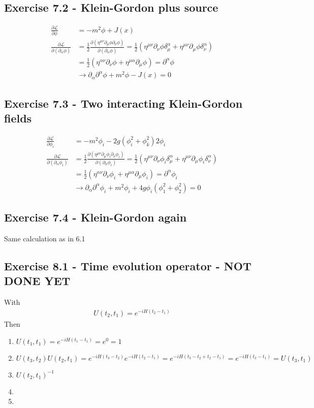 \documentclass[../main.tex]{subfiles}
\begin{document}
\subsection*{Exercise 7.2 - Klein-Gordon plus source}
\begin{align}
\frac{\partial\mathcal{L}}{\partial\phi}
&=-m^2\phi+J(x)\\
\frac{\partial\mathcal{L}}{\partial(\partial_\alpha\phi)}
&=\frac{1}{2}\frac{\partial(\eta^{\mu\nu}\partial_\mu\phi\partial_\nu\phi)}{\partial(\partial_\alpha\phi)}
=\frac{1}{2}(\eta^{\mu\nu}\partial_\nu\phi\delta_\mu^\alpha+\eta^{\mu\nu}\partial_\mu\phi\delta_\nu^\alpha)\\
&=\frac{1}{2}(\eta^{\alpha\nu}\partial_\nu\phi+\eta^{\mu\alpha}\partial_\mu\phi)=\partial^\alpha\phi\\
&\rightarrow\partial_\alpha\partial^\alpha\phi+m^2\phi-J(x)=0
\end{align}

\subsection*{Exercise 7.3 - Two interacting Klein-Gordon fields}
\begin{align}
\frac{\partial\mathcal{L}}{\partial\phi_i}
&=-m^2\phi_i-2g(\phi_i^2+\phi_k^2)2\phi_i\\
\frac{\partial\mathcal{L}}{\partial(\partial_\alpha\phi_i)}
&=\frac{1}{2}\frac{\partial(\eta^{\mu\nu}\partial_\mu\phi_i\partial_\nu\phi_i)}{\partial(\partial_\alpha\phi_i)}
=\frac{1}{2}(\eta^{\mu\nu}\partial_\nu\phi_i\delta_\mu^\alpha+\eta^{\mu\nu}\partial_\mu\phi_i\delta_\nu^\alpha)\\
&=\frac{1}{2}(\eta^{\alpha\nu}\partial_\nu\phi_i+\eta^{\mu\alpha}\partial_\mu\phi_i)=\partial^\alpha\phi_i\\
&\rightarrow\partial_\alpha\partial^\alpha\phi_i+m^2\phi_i+4g\phi_i(\phi_1^2+\phi_2^2)=0
\end{align}

\subsection*{Exercise 7.4 - Klein-Gordon again}
Same calculation as in 6.1

\subsection*{Exercise 8.1 - Time evolution operator - NOT DONE YET}
With
\begin{align}
U(t_2,t_1)=e^{-iH(t_2-t_1)}
\end{align}
Then
\begin{enumerate}[(1)]
\item $U(t_1,t_1)=e^{-iH(t_1-t_1)}=e^0=1$
\item $U(t_3,t_2)U(t_2,t_1)=e^{-iH(t_3-t_2)}e^{-iH(t_2-t_1)}=e^{-iH(t_3-t_2+t_2-t_1)}=e^{-iH(t_3-t_1)}=U(t_3,t_1)$
\item $U(t_2,t_1)^{-1}$
\item
\item
\end{enumerate}
\end{document}
